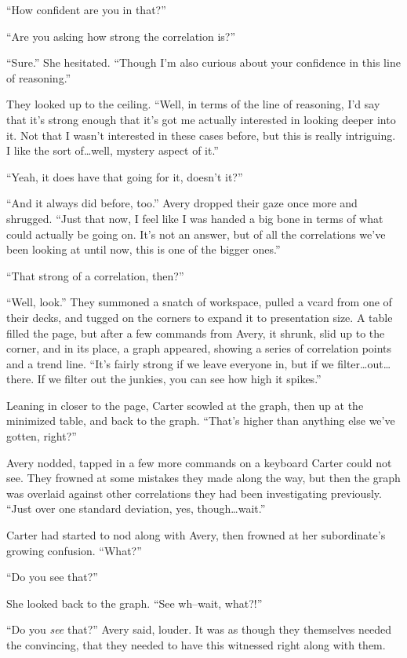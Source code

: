 ``How confident are you in that?''

``Are you asking how strong the correlation is?''

``Sure.'' She hesitated. ``Though I'm also curious about your confidence in this line of reasoning.''

They looked up to the ceiling. ``Well, in terms of the line of reasoning, I'd say that it's strong enough that it's got me actually interested in looking deeper into it. Not that I wasn't interested in these cases before, but this is really intriguing. I like the sort of\ldots{}well, mystery aspect of it.''

``Yeah, it does have that going for it, doesn't it?''

``And it always did before, too.'' Avery dropped their gaze once more and shrugged. ``Just that now, I feel like I was handed a big bone in terms of what could actually be going on. It's not an answer, but of all the correlations we've been looking at until now, this is one of the bigger ones.''

``That strong of a correlation, then?''

``Well, look.'' They summoned a snatch of workspace, pulled a vcard from one of their decks, and tugged on the corners to expand it to presentation size. A table filled the page, but after a few commands from Avery, it shrunk, slid up to the corner, and in its place, a graph appeared, showing a series of correlation points and a trend line. ``It's fairly strong if we leave everyone in, but if we filter\ldots{}out\ldots{}there. If we filter out the junkies, you can see how high it spikes.''

Leaning in closer to the page, Carter scowled at the graph, then up at the minimized table, and back to the graph. ``That's higher than anything else we've gotten, right?''

Avery nodded, tapped in a few more commands on a keyboard Carter could not see. They frowned at some mistakes they made along the way, but then the graph was overlaid against other correlations they had been investigating previously. ``Just over one standard deviation, yes, though\ldots{}wait.''

Carter had started to nod along with Avery, then frowned at her subordinate's growing confusion. ``What?''

``Do you see that?''

She looked back to the graph. ``See wh--wait, what?!''

``Do you \emph{see} that?'' Avery said, louder. It was as though they themselves needed the convincing, that they needed to have this witnessed right along with them.

